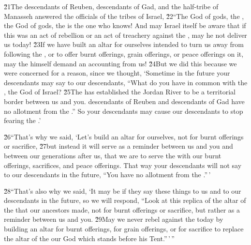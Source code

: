 \v{21}The descendants of Reuben, descendants of Gad, and the half-tribe of Manasseh answered the officials of the tribes of Israel, \v{22}``The God of gods, the , the God of gods, the  is the one who knows! And may Israel itself be aware that if this was an act of rebellion or an act of treachery against the , may he not deliver us today! \v{23}If we have built an altar for ourselves intended to turn us away from following the , or to offer burnt offerings, grain offerings, or peace offerings on it, may the  himself demand an accounting from us! \v{24}But we did this because we were concerned for a reason, since we thought, `Sometime in the future your descendants may say to our descendants, ``What do you have in common with the , the God of Israel? \v{25}The  has established the Jordan River to be a territorial border between us and you. descendants of Reuben and descendants of Gad have no allotment from the .'' So your descendants may cause our descendants to stop fearing the .'

\v{26}``That's why we said, `Let's build an altar for ourselves, not for burnt offerings or sacrifice, \v{27}but instead it will serve as a reminder between us and you and between our generations after us, that we are to serve the  with our burnt offerings, sacrifices, and peace offerings. That way your descendants will not say to our descendants in the future, ``You have no allotment from the .''\,'

\v{28}``That's also why we said, `It may be if they say these things to us and to our descendants in the future, so we will respond, ``Look at this replica of the altar of the  that our ancestors made, not for burnt offerings or sacrifice, but rather as a reminder between us and you. \v{29}May we never rebel against the  today by building an altar for burnt offerings, for grain offerings, or for sacrifice to replace the altar of the  our God which stands before his Tent.''\,'\,''

